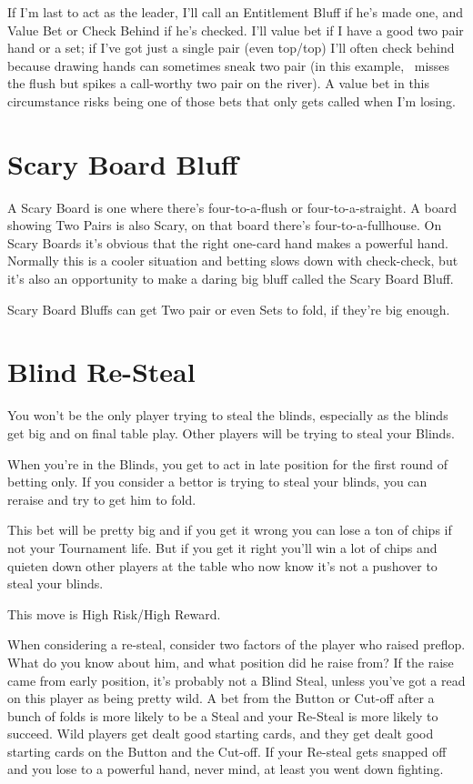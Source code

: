 If I'm last to act as the leader, I'll call an Entitlement Bluff
if he's made one, and Value Bet or Check Behind if he's checked.
I'll value bet if I have a good two pair hand or a set; if I've
got just a single pair (even top/top) I'll often check behind
because drawing hands can sometimes sneak two pair (in this example,
\sixd\fived\ misses the flush but spikes a call-worthy two pair
on the river). A value bet in this circumstance risks being one
of those bets that only gets called when I'm losing.


\section{Scary Board Bluff}

A Scary Board is one where there's four-to-a-flush or four-to-a-straight.
A board showing Two Pairs is also Scary, on that board there's
four-to-a-fullhouse.  On Scary Boards it's obvious that the
right one-card hand makes a powerful hand. Normally this is a
cooler situation and betting slows down with check-check, but it's
also an opportunity to make a daring big bluff called the Scary Board Bluff.

Scary Board Bluffs can get Two pair or even Sets to fold, if they're
big enough.

\section{Blind Re-Steal}

You won't be the only player trying to steal the blinds, especially
as the blinds get big and on final table play. Other players will
be trying to steal your Blinds.

When you're in the Blinds, you get to act in late position for
the first round of betting only. If you consider a bettor is
trying to steal your blinds, you can reraise and try to
get him to fold.

This bet will be pretty big and if you get it wrong you can
lose a ton of chips if not your Tournament life. But if you get
it right you'll win a lot of chips and quieten down other
players at the table who now know it's not a pushover to steal
your blinds.

This move is High Risk/High Reward.

When considering a re-steal, consider two factors of the player who
raised preflop. What do you know about him, and what position did he
raise from? If the raise came from early position, it's probably not a
Blind Steal, unless you've got a read on this player as being pretty
wild. A bet from the Button or Cut-off after a bunch of folds is more
likely to be a Steal and your Re-Steal is more likely to succeed. Wild
players get dealt good starting cards, and they get dealt good
starting cards on the Button and the Cut-off. If your Re-steal gets
snapped off and you lose to a powerful hand, never mind, at least you
went down fighting.
